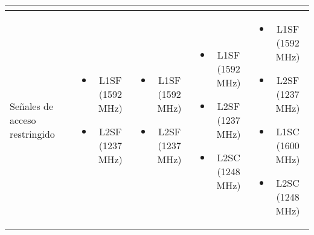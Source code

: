 \begin{center}
\begin{longtable}{|p{3cm}|c|c|c|c|}
{{                \vspace{10pt}
            }
        } \\
        \hline
        Señales de acceso restringido &
        \parbox[t]{2.5cm}{
            \vspace{-7pt}
            {\fontsize{9}{11}\selectfont
                \begin{itemize}[label={}, leftmargin=0pt, topsep=0pt, partopsep=0pt, parsep=0pt, itemsep=0pt]
                    \item L1SF (1592 MHz)
                    \item L2SF (1237 MHz)
                \end{itemize}
            }
        } &
        \parbox[t]{2.5cm}{
            \vspace{-7pt}
            {\fontsize{9}{11}\selectfont
                \begin{itemize}[label={}, leftmargin=0pt, topsep=0pt, partopsep=0pt, parsep=0pt, itemsep=0pt]
                    \item L1SF (1592 MHz)
                    \item L2SF (1237 MHz)
                \end{itemize}
            }
        } &
        \parbox[t]{2.5cm}{
            \vspace{-7pt}
            {\fontsize{9}{11}\selectfont
                \begin{itemize}[label={}, leftmargin=0pt, topsep=0pt, partopsep=0pt, parsep=0pt, itemsep=0pt]
                    \item L1SF (1592 MHz)
                    \item L2SF (1237 MHz)
                    \item L2SC (1248 MHz)
                \end{itemize}
            }
        } &
        \parbox[t]{2.5cm}{
            \vspace{-7pt}
            {\fontsize{9}{11}\selectfont
                \begin{itemize}[label={}, leftmargin=0pt, topsep=0pt, partopsep=0pt, parsep=0pt, itemsep=0pt]
                    \item L1SF (1592 MHz)
                    \item L2SF (1237 MHz)
                    \item L1SC (1600 MHz)
                    \item L2SC (1248 MHz)
                \end{itemize}
                \vspace{10pt}
            }
        } \\
    \end{longtable}    
\end{center}

